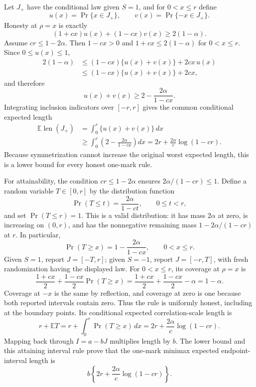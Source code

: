 Let \(J_+\) have the conditional law given \(S=1\), and for \(0<x\leq r\) define
\[
 u(x)=\Pr\{x\in J_+\},\qquad v(x)=\Pr\{-x\in J_+\}.
\]
Honesty at \(\rho=x\) is exactly
\[
 (1+cx)u(x)+(1-cx)v(x)\geq 2(1-\alpha).
\]
Assume \(cr\leq1-2\alpha\).  Then \(1-cx>0\) and \(1+cx\leq2(1-\alpha)\) for \(0<x\leq r\).  Since \(0\leq u(x)\leq1\),
\[
 \begin{aligned}
 2(1-\alpha)
 &\leq (1-cx)\{u(x)+v(x)\}+2cx\,u(x)\\
 &\leq (1-cx)\{u(x)+v(x)\}+2cx,
 \end{aligned}
\]
and therefore
\[
 u(x)+v(x)\geq 2-\frac{2\alpha}{1-cx}.
\]
Integrating inclusion indicators over \([-r,r]\) gives the common conditional expected length
\[
 \begin{aligned}
 \mathbb E\operatorname{len}(J_+)
 &=\int_0^r\{u(x)+v(x)\}\,dx\\
 &\geq\int_0^r\left(2-\frac{2\alpha}{1-cx}\right)dx
 =2r+\frac{2\alpha}{c}\log(1-cr).
 \end{aligned}
\]
Because symmetrization cannot increase the original worst expected length, this is a lower bound for every honest one-mark rule.

For attainability, the condition \(cr\leq1-2\alpha\) ensures \(2\alpha/(1-cr)\leq1\).  Define a random variable \(T\in[0,r]\) by the distribution function
\[
 \Pr(T\leq t)=\frac{2\alpha}{1-ct},\qquad 0\leq t<r,
\]
and set \(\Pr(T\leq r)=1\).  This is a valid distribution: it has mass \(2\alpha\) at zero, is increasing on \((0,r)\), and has the nonnegative remaining mass \(1-2\alpha/(1-cr)\) at \(r\).  In particular,
\[
 \Pr(T\geq x)=1-\frac{2\alpha}{1-cx},\qquad 0<x\leq r.
\]
Given \(S=1\), report \(J=[-T,r]\); given \(S=-1\), report \(J=[-r,T]\), with fresh randomization having the displayed law.  For \(0<x\leq r\), its coverage at \(\rho=x\) is
\[
 \frac{1+cx}{2}+\frac{1-cx}{2}\Pr(T\geq x)
 =\frac{1+cx}{2}+\frac{1-cx}{2}-\alpha
 =1-\alpha.
\]
Coverage at \(-x\) is the same by reflection, and coverage at zero is one because both reported intervals contain zero.  Thus the rule is uniformly honest, including at the boundary points.  Its conditional expected correlation-scale length is
\[
 r+\mathbb ET
 =r+\int_0^r\Pr(T\geq x)\,dx
 =2r+\frac{2\alpha}{c}\log(1-cr).
\]
Mapping back through \(I=a-bJ\) multiplies length by \(b\).  The lower bound and this attaining interval rule prove that the one-mark minimax expected endpoint-interval length is
\[
 b\left\{2r+\frac{2\alpha}{c}\log(1-cr)\right\}.
\]
